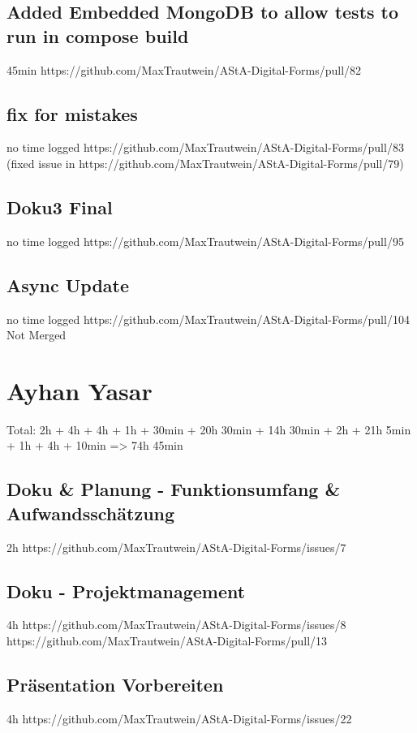 \subsection{Added Embedded MongoDB to allow tests to run in compose build}
45min
https://github.com/MaxTrautwein/AStA-Digital-Forms/pull/82

\subsection{fix for mistakes}
no time logged
https://github.com/MaxTrautwein/AStA-Digital-Forms/pull/83
(fixed issue in https://github.com/MaxTrautwein/AStA-Digital-Forms/pull/79)

\subsection{Doku3 Final}
no time logged
https://github.com/MaxTrautwein/AStA-Digital-Forms/pull/95

\subsection{Async Update}
no time logged
https://github.com/MaxTrautwein/AStA-Digital-Forms/pull/104
Not Merged

\section{Ayhan Yasar}\label{sec:ayhan-yasar}

Total: 2h + 4h + 4h + 1h + 30min + 20h 30min + 14h 30min + 2h + 21h 5min + 1h + 4h + 10min
=> 74h 45min

\subsection{Doku & Planung - Funktionsumfang & Aufwandsschätzung}
2h
https://github.com/MaxTrautwein/AStA-Digital-Forms/issues/7

\subsection{Doku - Projektmanagement}
4h
https://github.com/MaxTrautwein/AStA-Digital-Forms/issues/8
https://github.com/MaxTrautwein/AStA-Digital-Forms/pull/13

\subsection{Präsentation Vorbereiten}
4h
https://github.com/MaxTrautwein/AStA-Digital-Forms/issues/22
